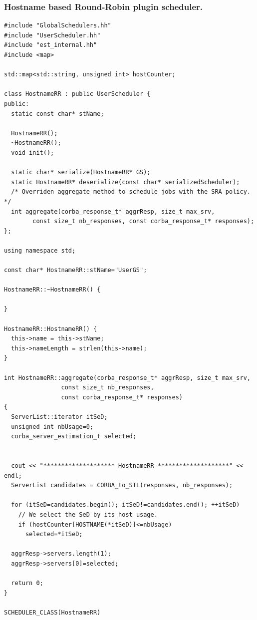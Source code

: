 \subsubsection{Hostname based Round-Robin plugin scheduler.}
\begin{verbatim}
#include "GlobalSchedulers.hh"
#include "UserScheduler.hh"
#include "est_internal.hh"
#include <map>

std::map<std::string, unsigned int> hostCounter;

class HostnameRR : public UserScheduler {
public:
  static const char* stName;

  HostnameRR();
  ~HostnameRR();
  void init();

  static char* serialize(HostnameRR* GS);
  static HostnameRR* deserialize(const char* serializedScheduler);
  /* Overriden aggregate method to schedule jobs with the SRA policy. */
  int aggregate(corba_response_t* aggrResp, size_t max_srv,
		const size_t nb_responses, const corba_response_t* responses);
};

using namespace std;

const char* HostnameRR::stName="UserGS";

HostnameRR::~HostnameRR() {

}

HostnameRR::HostnameRR() {
  this->name = this->stName;
  this->nameLength = strlen(this->name);
}

int HostnameRR::aggregate(corba_response_t* aggrResp, size_t max_srv,
			    const size_t nb_responses,
			    const corba_response_t* responses)
{
  ServerList::iterator itSeD;
  unsigned int nbUsage=0;
  corba_server_estimation_t selected;
  

  cout << "******************** HostnameRR ********************" << endl;
  ServerList candidates = CORBA_to_STL(responses, nb_responses);

  for (itSeD=candidates.begin(); itSeD!=candidates.end(); ++itSeD)
    // We select the SeD by its host usage.
    if (hostCounter[HOSTNAME(*itSeD)]<=nbUsage)
	  selected=*itSeD;

  aggrResp->servers.length(1);
  aggrResp->servers[0]=selected;

  return 0;
}

SCHEDULER_CLASS(HostnameRR)
\end{verbatim}
%
